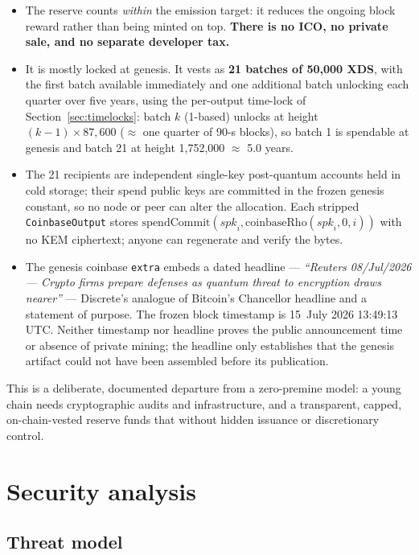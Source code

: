 \documentclass[11pt,a4paper]{article}
\newcommand{\code}[1]{\texttt{\small #1}}
\begin{document}
\begin{itemize}
\item The reserve counts \emph{within} the emission target: it reduces the
  ongoing block reward rather than being minted on top.
  \textbf{There is no ICO, no private sale, and no separate developer tax.}
\item It is mostly locked at genesis. It vests as \textbf{21 batches of
  50{,}000 XDS}, with the first batch available immediately and one additional
  batch unlocking each quarter over five years, using the
  per-output time-lock of Section~\ref{sec:timelocks}: batch $k$ (1-based)
  unlocks at height $(k{-}1) \times 87{,}600$ ($\approx$ one quarter of
  90-s blocks), so batch 1 is spendable at genesis and batch 21 at height
  1{,}752{,}000 $\approx$ 5.0 years.
\item The 21 recipients are independent single-key post-quantum accounts held
  in cold storage; their spend public keys are committed in the frozen
  genesis constant, so no node or peer can alter the allocation. Each stripped
  \code{CoinbaseOutput} stores
  $\mathrm{spendCommit}(\mathit{spk}_i,
  \mathrm{coinbaseRho}(\mathit{spk}_i,0,i))$ with no KEM ciphertext; anyone can
  regenerate and verify the bytes.
\item The genesis coinbase \code{extra} embeds a dated headline ---
  \emph{``Reuters 08/Jul/2026 --- Crypto firms prepare defenses as quantum
  threat to encryption draws nearer''} --- Discrete's analogue of Bitcoin's
  Chancellor headline and a statement of purpose. The frozen block timestamp is
  15~July 2026 13:49:13 UTC. Neither timestamp nor headline proves the public
  announcement time or absence of private mining; the headline only establishes
  that the genesis artifact could not have been assembled before its publication.
\end{itemize}

This is a deliberate, documented departure from a zero-premine model: a young
chain needs cryptographic audits and infrastructure, and a transparent,
capped, on-chain-vested reserve funds that without hidden issuance or
discretionary control.
\section{Security analysis}\label{sec:security}

\subsection{Threat model}
\end{document}
